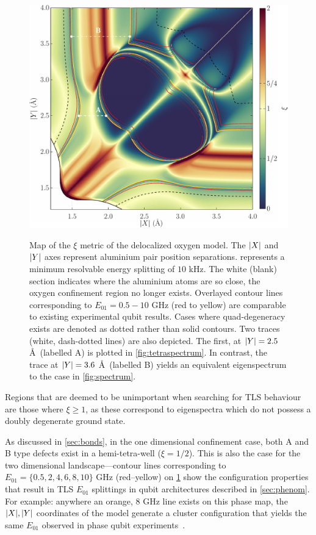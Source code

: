 \begin{figure}[htp]
\includegraphics[width=\textwidth]{figures/xiunbound}\\
\caption[$\xi$ Metric Phase Map, Unbound in $z$]{\label{fig:xiunbound}Map of the $\xi$ metric of the delocalized oxygen  model. The $\lvert X\rvert$ and $\lvert Y\rvert$ axes represent aluminium pair position separations.  represents a minimum resolvable energy splitting of $10$ kHz. The white (blank) section indicates where the aluminium atoms are so close, the oxygen confinement region no longer exists. Overlayed contour lines corresponding to $E_{01} = 0.5\!-\!10$ GHz (red to yellow) are comparable to existing experimental qubit results. Cases where quad-degeneracy exists are denoted as dotted rather than solid contours. Two traces (white, dash-dotted lines) are also depicted. The first, at $\lvert Y\rvert = 2.5$ \AA\ (labelled A) is plotted in \cref{fig:tetraspectrum}. In contrast, the trace at $\lvert Y\rvert = 3.6$ \AA\ (labelled B) yields an equivalent eigenspectrum to the  case in \cref{fig:spectrum}.}
\end{figure}

Regions that are deemed to be unimportant when searching for TLS behaviour are those where $\xi \geq 1$, as these correspond to eigenspectra which do not possess a doubly degenerate ground state.

As discussed in \cref{sec:bonds}, in the one dimensional confinement case, both A and B type defects exist in a hemi-tetra-well ($\xi = 1/2$).
This is also the case for the two dimensional landscape---contour lines corresponding to $E_{01} = \{0.5, 2, 4, 6, 8, 10\}$ GHz (red--yellow) on \cref{fig:xiunbound} show the configuration properties that result in TLS $E_{01}$ splittings in qubit architectures described in \cref{sec:phenom}.
For example: anywhere an orange, $8$ GHz line exists on this phase map, the $\lvert X\rvert, \lvert Y\rvert$ coordinates of the model generate a cluster configuration that yields the same $E_{01}$ observed in phase qubit experiments~\cite{Cole2010}.

